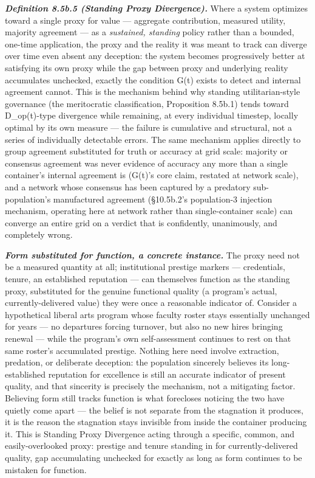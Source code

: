 \documentclass[
]{article}
\begin{document}
\emph{\textbf{Definition 8.5b.5 (Standing Proxy Divergence).}} Where a
system optimizes toward a single proxy for value --- aggregate
contribution, measured utility, majority agreement --- as a
\emph{sustained, standing} policy rather than a bounded, one-time
application, the proxy and the reality it was meant to track can diverge
over time even absent any deception: the system becomes progressively
better at satisfying its own proxy while the gap between proxy and
underlying reality accumulates unchecked, exactly the condition G(t)
exists to detect and internal agreement cannot. This is the mechanism
behind why standing utilitarian-style governance (the meritocratic
classification, Proposition 8.5b.1) tends toward D\_op(t)-type
divergence while remaining, at every individual timestep, locally
optimal by its own measure --- the failure is cumulative and structural,
not a series of individually detectable errors. The same mechanism
applies directly to group agreement substituted for truth or accuracy at
grid scale: majority or consensus agreement was never evidence of
accuracy any more than a single container's internal agreement is
(G(t)'s core claim, restated at network scale), and a network whose
consensus has been captured by a predatory sub-population's manufactured
agreement (§10.5b.2's population-3 injection mechanism, operating here
at network rather than single-container scale) can converge an entire
grid on a verdict that is confidently, unanimously, and completely
wrong.

\emph{\textbf{Form substituted for function, a concrete instance.}} The
proxy need not be a measured quantity at all; institutional prestige
markers --- credentials, tenure, an established reputation --- can
themselves function as the standing proxy, substituted for the genuine
functional quality (a program's actual, currently-delivered value) they
were once a reasonable indicator of. Consider a hypothetical liberal
arts program whose faculty roster stays essentially unchanged for years
--- no departures forcing turnover, but also no new hires bringing
renewal --- while the program's own self-assessment continues to rest on
that same roster's accumulated prestige. Nothing here need involve
extraction, predation, or deliberate deception: the population sincerely
believes its long-established reputation for excellence is still an
accurate indicator of present quality, and that sincerity is precisely
the mechanism, not a mitigating factor. Believing form still tracks
function is what forecloses noticing the two have quietly come apart ---
the belief is not separate from the stagnation it produces, it is the
reason the stagnation stays invisible from inside the container
producing it. This is Standing Proxy Divergence acting through a
specific, common, and easily-overlooked proxy: prestige and tenure
standing in for currently-delivered quality, gap accumulating unchecked
for exactly as long as form continues to be mistaken for function.
\end{document}
